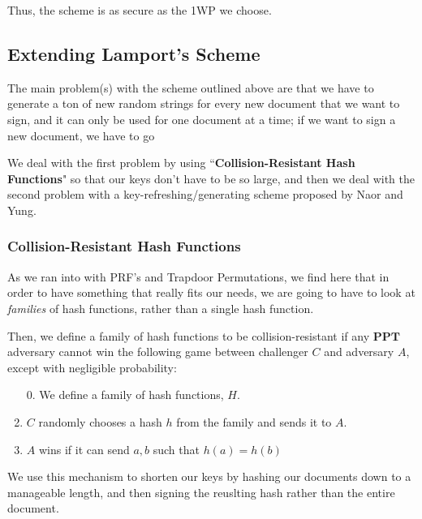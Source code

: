 \documentclass[11pt]{article}
\newcommand{\PPT}{\mathbf{PPT}}
\begin{document}
Thus, the scheme is as secure as the 1WP we choose.

\subsection{Extending Lamport's Scheme}

The main problem(s) with the scheme outlined above are that we have to generate a ton of new random strings for every new document that we want to sign, and  it can only be used for one document at a time; if we want to sign a new document, we have to go 

We deal with the first problem by using ``\textbf{Collision-Resistant Hash Functions}" so that our keys don't have to be so large, and then we deal with the second problem with a key-refreshing/generating scheme proposed by Naor and Yung. 

\subsubsection{Collision-Resistant Hash Functions}

As we ran into with PRF's and Trapdoor Permutations, we find here that in order to have something that really fits our needs, we are going to have to look at \emph{families} of hash functions, rather than a single hash function.\medskip

Then, we define a family of hash functions to be collision-resistant if any \(\PPT\) adversary cannot win the following game between challenger \(C\) and adversary \(A\), except with negligible probability:
\begin{enumerate}
\item [0.] We define a family of hash functions, \(H\).
\item \(C\) randomly chooses a hash \(h\) from the family and sends it to \(A\).
\item \(A\) wins if it can send \(a,b\) such that \(h(a)=h(b)\)
\end{enumerate}

We use this mechanism to shorten our keys by hashing our documents down to a manageable length, and then signing the reuslting hash rather than the entire document.\smallskip
\end{document}
